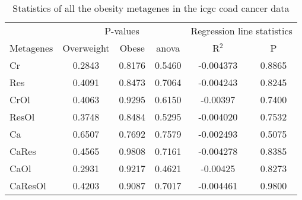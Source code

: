 \begin{appendices}
\begin{table}[htpb]
	\centering
	\caption[Statistics of all the obesity metagenes in the \gls{icgc} \acrshort{coad} cancer data]{Statistics of all the obesity metagenes in the \gls{icgc} \gls{coad} cancer data}
	\label{tab:degmetacoad}
	\begin{threeparttable}
		\begin{tabular}{lccccc}
			& \multicolumn{3}{c}{ P-values} & \multicolumn{2}{c}{ Regression line statistics}\\
			\cmidrule(r){2-4} \cmidrule(r){5-6}
			Metagenes &  Overweight &  Obese &  \gls{anova} &  R$^2$ &  P \\
			\hline
			\hline
			\rule{0pt}{2.25ex}Cr      & 0.2843                      & 0.8176  & 0.5460             & -0.004373  & 0.8865              \\
			Res     & 0.4091                      & 0.8473  & 0.7064             & -0.004243  & 0.8245              \\
			CrOl    & 0.4063                      & 0.9295  & 0.6150             & -0.00397   & 0.7400              \\
			ResOl   & 0.3748                      & 0.8484  & 0.5295             & -0.004020  & 0.7532              \\
			Ca      & 0.6507                      & 0.7692  & 0.7579             & -0.002493  & 0.5075              \\
			CaRes   & 0.4565                      & 0.9808  & 0.7161             & -0.004278  & 0.8385              \\
			CaOl    & 0.2931                      & 0.9217  & 0.4621             & -0.00425   & 0.8273              \\
			CaResOl & 0.4203                      & 0.9087  & 0.7017             & -0.004461  & 0.9800              \\
			\hline
			\hline
		\end{tabular}
	\end{threeparttable}
\end{table}


\end{appendices}
